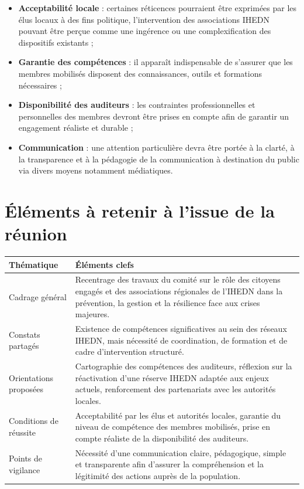 \documentclass[12pt,a4paper]{article}
\begin{document}
\begin{itemize}
    \item \textbf{Acceptabilité locale} : certaines réticences pourraient être exprimées par les élus locaux à des fins politique, l'intervention des associations IHEDN pouvant être perçue comme une ingérence ou une complexification des dispositifs existants ;
    \item \textbf{Garantie des compétences} : il apparaît indispensable de s'assurer que les membres mobilisés disposent des connaissances, outils et formations nécessaires ;
    \item \textbf{Disponibilité des auditeurs} : les contraintes professionnelles et personnelles des membres devront être prises en compte afin de garantir un engagement réaliste et durable ;
    \item \textbf{Communication} : une attention particulière devra être portée à la clarté, à la transparence et à la pédagogie de la communication à destination du public via divers moyens notamment médiatiques.
\end{itemize}

\section{Éléments à retenir à l'issue de la réunion}

\begin{center}
\renewcommand{\arraystretch}{1.3}
\begin{tabular}{|p{4cm}|p{10cm}|}
\hline
\textbf{Thématique} & \textbf{Éléments clefs} \\
\hline
Cadrage général &
Recentrage des travaux du comité sur le rôle des citoyens engagés et des associations régionales de l'IHEDN dans la prévention, la gestion et la résilience face aux crises majeures. \\
\hline
Constats partagés &
Existence de compétences significatives au sein des réseaux IHEDN, mais nécessité de coordination, de formation et de cadre d'intervention structuré. \\
\hline
Orientations proposées &
Cartographie des compétences des auditeurs, réflexion sur la réactivation d'une réserve IHEDN adaptée aux enjeux actuels, renforcement des partenariats avec les autorités locales. \\
\hline
Conditions de réussite &
Acceptabilité par les élus et autorités locales, garantie du niveau de compétence des membres mobilisés, prise en compte réaliste de la disponibilité des auditeurs. \\
\hline
Points de vigilance &
Nécessité d'une communication claire, pédagogique, simple et transparente afin d'assurer la compréhension et la légitimité des actions auprès de la population. \\
\hline
\end{tabular}
\end{center}
\end{document}
